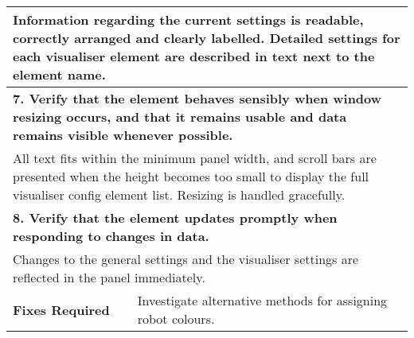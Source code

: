 \begin{longtable}{ l p{10cm} }
 \multicolumn{2}{p{14cm}}{Information regarding the current settings is readable, correctly arranged and clearly labelled. Detailed settings for each visualiser element are described in text next to the element name.}\\
 \hline
 \multicolumn{2}{p{14cm}}{\textbf{7. Verify that the element behaves sensibly when window resizing occurs, and that it remains usable and data remains visible whenever possible.}}\\
 \multicolumn{2}{p{14cm}}{All text fits within the minimum panel width, and scroll bars are presented when the height becomes too small to display the full visualiser config element list. Resizing is handled gracefully.}\\
 \hline
 \multicolumn{2}{p{14cm}}{\textbf{8. Verify that the element updates promptly when responding to changes in data.}}\\
 \multicolumn{2}{p{14cm}}{Changes to the general settings and the visualiser settings are reflected in the panel immediately.}\\
 \hline
 \textbf{Fixes Required} & Investigate alternative methods for assigning robot colours.\\
 \bottomrule
\end{longtable}
\clearpage

